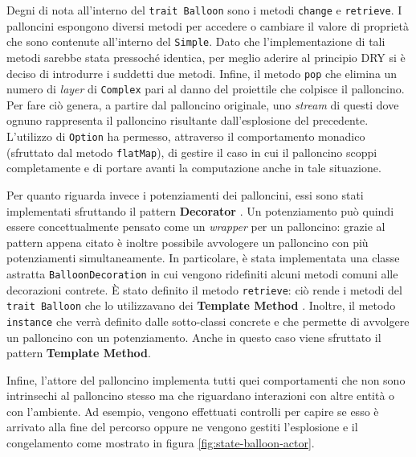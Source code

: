 Degni di nota all'interno del \texttt{trait Balloon} sono i metodi \texttt{change} e \texttt{retrieve}. I palloncini
espongono diversi metodi per accedere o cambiare il valore di proprietà che sono contenute all'interno del
\texttt{Simple}. Dato che l'implementazione di tali metodi sarebbe stata pressoché identica, per meglio aderire al
principio DRY si è deciso di introdurre i suddetti due metodi.
Infine, il metodo \texttt{pop} che elimina un numero di \textit{layer} di \texttt{Complex} pari al danno del proiettile
che colpisce il palloncino. Per fare ciò genera, a partire dal palloncino originale, uno \textit{stream} di questi dove
ognuno rappresenta il palloncino risultante dall'esplosione del precedente. L'utilizzo di \texttt{Option} ha permesso,
attraverso il comportamento monadico (sfruttato dal metodo \texttt{flatMap}), di gestire il caso in cui il palloncino
scoppi completamente e di portare avanti la computazione anche in tale situazione.



Per quanto riguarda invece i potenziamenti dei palloncini, essi sono stati implementati sfruttando il pattern
\textbf{Decorator} \cite{gof}. Un potenziamento può quindi essere concettualmente pensato come un \textit{wrapper} per un
palloncino: grazie al pattern appena citato è inoltre possibile avvologere un palloncino con più potenziamenti
simultaneamente. In particolare, è stata implementata una classe astratta \texttt{BalloonDecoration} in cui vengono
ridefiniti alcuni metodi comuni alle decorazioni contrete. È stato definito il metodo \texttt{retrieve}: ciò rende i
metodi del \texttt{trait Balloon} che lo utilizzavano dei \textbf{Template Method} \cite{gof}. Inoltre, il metodo
\texttt{instance} che verrà definito dalle sotto-classi concrete e che permette di avvolgere un palloncino con un
potenziamento. Anche in questo caso viene sfruttato il pattern \textbf{Template Method}.

Infine, l'attore del palloncino implementa tutti quei comportamenti che non sono intrinsechi al palloncino stesso ma che
riguardano interazioni con altre entità o con l'ambiente. Ad esempio, vengono effettuati controlli per capire se esso è
arrivato alla fine del percorso oppure ne vengono gestiti l'esplosione e il congelamento come mostrato in figura
\ref{fig:state-balloon-actor}.

